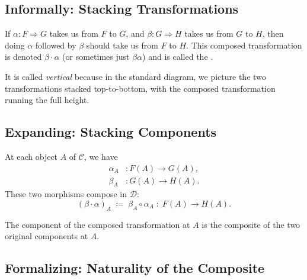 \subsection{Informally: Stacking Transformations}

If $\alpha : F \Rightarrow G$ takes us from $F$ to $G$, and $\beta : G
\Rightarrow H$ takes us from $G$ to $H$, then doing $\alpha$ followed by
$\beta$ should take us from $F$ to $H$. This composed transformation is
denoted $\beta \cdot \alpha$ (or sometimes just $\beta \alpha$) and is called
the .

It is called \emph{vertical} because in the standard diagram, we picture the
two transformations stacked top-to-bottom, with the composed transformation
running the full height.

\subsection{Expanding: Stacking Components}

\begin{center}
\end{center}

At each object $A$ of $\mathcal{C}$, we have
\begin{align*}
  \alpha_A &: F(A) \to G(A), \\
  \beta_A  &: G(A) \to H(A).
\end{align*}
These two morphisms compose in $\mathcal{D}$:
\begin{equation*}
  (\beta \cdot \alpha)_A \;\coloneqq\; \beta_A \circ \alpha_A
  \;:\; F(A) \to H(A).
\end{equation*}

The component of the composed transformation at $A$ is the composite of
the two original components at $A$.

\subsection{Formalizing: Naturality of the Composite}

